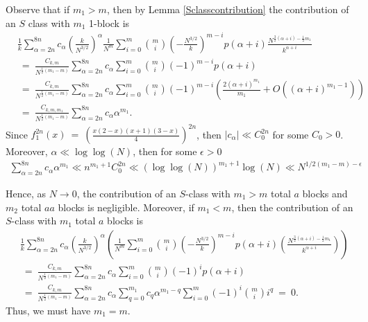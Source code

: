 \documentclass[11pt,reqno]{amsart}
\numberwithin{equation}{section}
\theoremstyle{plain}
\begin{document}
Observe that if $m_1>m$, then by Lemma \ref{Sclasscontribution} the contribution of an $S$ class with $m_1$ 1-block is
\begin{align}
&\frac{1}{k}\sum_{\alpha=2n}^{8n}c_\alpha\left(\frac{k}{N^{3/2}}\right)^\alpha\frac{1}{N^m}\sum_{i=0}^m\binom{m}{i}\left(-\frac{N^{3/2}}{k}\right)^{m-i}p(\alpha+i)\frac{N^{\frac{3}{2}(\alpha+i)-\frac{1}{2}m_1}}{k^{\alpha+i}} \nonumber \\
&\ = \ \frac{C_{k,m}}{N^{\frac{1}{2}(m_1-m)}}\sum_{\alpha=2n}^{8n}c_\alpha \sum_{i=0}^m\binom{m}{i}(-1)^{m-i}p(\alpha+i) \nonumber \\
&\ = \ \frac{C_{k,m}}{N^{\frac{1}{2}(m_1-m)}}\sum_{\alpha=2n}^{8n}c_\alpha \sum_{i=0}^m\binom{m}{i}(-1)^{m-i}\left(\frac{2(\alpha+i)^{m_1}}{m_1}+O\left((\alpha+i)^{m_1-1}\right)\right) \nonumber \\
&\ = \ \frac{C_{k,m,m_1}}{N^{\frac{1}{2}(m_1-m)}}\sum_{\alpha=2n}^{8n}c_\alpha\alpha^{m_1}.
\end{align}
Since $f_1^{2n}(x) \ = \ \left(\frac{x(2-x)(x+1)(3-x)}{4}\right)^{2n}$, then $|c_\alpha|\ll C_0^{2n}$ for some $C_0>0$. Moreover, $\alpha\ll\log\log(N)$, then for some $\epsilon>0$ 
\begin{align}
\sum_{\alpha=2n}^{8n}c_\alpha \alpha^{m_1}\ll n^{m_1+1}C_0^{2n}\ll (\log\log(N))^{m_1+1}\log(N)\ll N^{1/2(m_1-m)-\epsilon}
\end{align}

Hence, as $N\rightarrow 0$, the contribution of an $S$-class with $m_1>m$ total $a$ blocks and $m_2$ total $aa$ blocks is negligible. Moreover, if $m_1<m$, then the contribution of an $S$-class with $m_1$ total $a$ blocks is
\begin{align}
&\frac{1}{k}\sum_{\alpha=2n}^{8n}c_\alpha\left(\frac{k}{N^{3/2}}\right)^\alpha\left(\frac{1}{N^m}\sum_{i=0}^m\binom{m}{i}\left(-\frac{N^{3/2}}{k}\right)^{m-i}p(\alpha+i)\left(\frac{N^{\frac{3}{2}(\alpha+i)-\frac{1}{2}m_1}}{k^{\alpha+i}}\right)\right) \nonumber \\
&\ = \ \frac{C_{k,m}}{N^{\frac{1}{2}(m_1-m)}}\sum_{\alpha=2n}^{8n}c_\alpha\sum_{i=0}^m\binom{m}{i}(-1)^ip(\alpha+i) \nonumber \\
&\ = \ \frac{C_{k,m}}{N^{\frac{1}{2}(m_1-m)}}\sum_{\alpha=2n}^{8n}c_\alpha \sum_{q=0}^{m_1}c_q \alpha^{m_1-q} \sum_{i=0}^m(-1)^i\binom{m}{i} i^q \ = \ 0.
\end{align}
Thus, we must have $m_1=m$.
\end{document}
